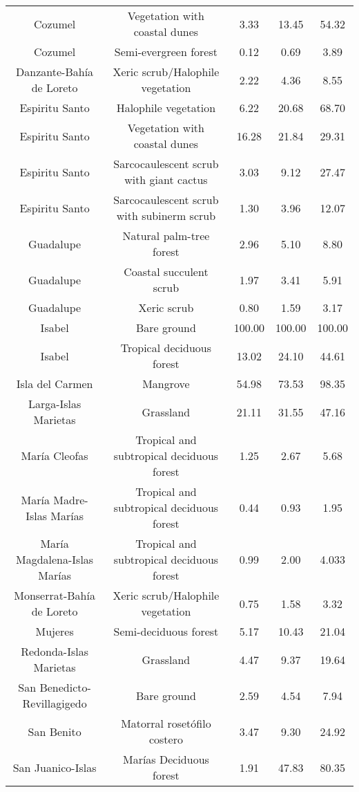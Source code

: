 \documentclass{article} %
\begin{document}
\begin{table}
\begin{adjustwidth}{-0.5cm}{}
\begin{tabular}{ccccc}
Cozumel &    Vegetation with coastal dunes & 3.33 & 13.45 & 54.32 \\
Cozumel &      Semi-evergreen forest & 0.12 & 0.69 &  3.89 \\
Danzante-Bahía de Loreto &    Xeric scrub/Halophile vegetation & 2.22 & 4.36 &  8.55 \\
Espiritu Santo &       Halophile vegetation & 6.22 & 20.68 & 68.70 \\
Espiritu Santo &    Vegetation with coastal dunes & 16.28 & 21.84 & 29.31 \\
Espiritu Santo &  Sarcocaulescent scrub with giant cactus & 3.03 & 9.12 & 27.47 \\
Espiritu Santo & Sarcocaulescent scrub with subinerm scrub & 1.30 & 3.96 & 12.07 \\
Guadalupe &     Natural palm-tree forest & 2.96 & 5.10 &  8.80 \\ 
Guadalupe &      Coastal succulent scrub & 1.97 & 3.41 &  5.91 \\
Guadalupe &         Xeric scrub & 0.80 & 1.59 &  3.17 \\
Isabel &         Bare ground & 100.00 & 100.00 & 100.00 \\
Isabel &     Tropical deciduous forest & 13.02 & 24.10 & 44.61 \\
Isla del Carmen &         Mangrove & 54.98 & 73.53 & 98.35 \\
Larga-Islas Marietas &         Grassland & 21.11 & 31.55 & 47.16 \\
María Cleofas & Tropical and subtropical deciduous forest & 1.25 & 2.67 &  5.68 \\
María Madre-Islas Marías & Tropical and subtropical deciduous forest & 0.44 & 0.93 &  1.95 \\
María Magdalena-Islas Marías & Tropical and subtropical deciduous forest & 0.99 & 2.00 &  4.033 \\
Monserrat-Bahía de Loreto &   Xeric scrub/Halophile vegetation & 0.75 & 1.58 &  3.32 \\
Mujeres &      Semi-deciduous forest & 5.17 & 10.43 & 21.04 \\
Redonda-Islas Marietas & Grassland & 4.47 & 9.37 & 19.64 \\
San Benedicto-Revillagigedo &      Bare ground & 2.59 & 4.54 &  7.94 \\
San Benito &     Matorral rosetófilo costero & 3.47 & 9.30 & 24.92 \\
San Juanico-Islas &      Marías Deciduous forest & 1.91 & 47.83 & 80.35 \\

\end{tabular}
\end{adjustwidth}
\end{table}
\end{document}
